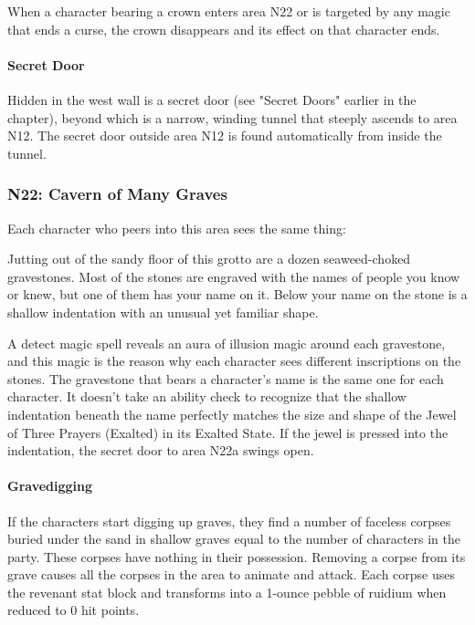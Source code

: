 \documentclass[10pt,a4paper,twoside,twocolumn,openany,nodeprecatedcode]{dndbook}
\begin{document}
When a character bearing a crown enters area N22 or is targeted by any magic that ends a curse, the crown disappears and its effect on that character ends.

\paragraph{Secret Door}
Hidden in the west wall is a secret door (see "Secret Doors" earlier in the chapter), beyond which is a narrow, winding tunnel that steeply ascends to area N12. The secret door outside area N12 is found automatically from inside the tunnel.

\subsubsection{N22: Cavern of Many Graves}
Each character who peers into this area sees the same thing:

\begin{DndReadAloud}{}
Jutting out of the sandy floor of this grotto are a dozen seaweed-choked gravestones. Most of the stones are engraved with the names of people you know or knew, but one of them has your name on it. Below your name on the stone is a shallow indentation with an unusual yet familiar shape.

\end{DndReadAloud}

A detect magic spell reveals an aura of illusion magic around each gravestone, and this magic is the reason why each character sees different inscriptions on the stones. The gravestone that bears a character's name is the same one for each character. It doesn't take an ability check to recognize that the shallow indentation beneath the name perfectly matches the size and shape of the Jewel of Three Prayers (Exalted) in its Exalted State. If the jewel is pressed into the indentation, the secret door to area N22a swings open.

\paragraph{Gravedigging}
If the characters start digging up graves, they find a number of faceless corpses buried under the sand in shallow graves equal to the number of characters in the party. These corpses have nothing in their possession. Removing a corpse from its grave causes all the corpses in the area to animate and attack. Each corpse uses the revenant stat block and transforms into a 1-ounce pebble of ruidium when reduced to 0 hit points.
\end{document}
